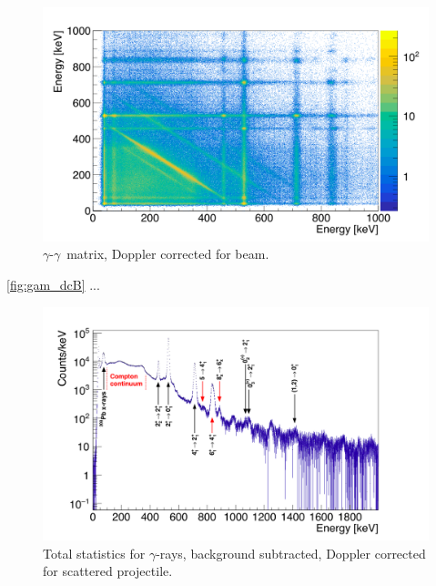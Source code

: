 \documentclass[twoside,english]{uiofysmaster/uiofysmaster}
\newcommand{\ga}{$\gamma$}
\let\orgautoref\autoref
\renewcommand{\autoref}
        {%
		 \def\subsectionautorefname{Section}%
		 \def\subsubsectionautorefname{Section}%
          \orgautoref}
\begin{document}
\begin{figure}[ht]
	\centering
	\includegraphics[width=\textwidth]{../Plots/plotting/gg_dcB.png}
	\caption{\ga-\ga\ matrix, Doppler corrected for beam.}
	\label{fig:gg_dcB}
\end{figure}


\autoref{fig:gam_dcB} ...

\begin{figure}[ht]
	\centering
	\includegraphics[width=\textwidth]{../Plots/plotting/gam_dcB.png}
	\caption{Total statistics for \ga-rays, 
      background subtracted, Doppler corrected for scattered projectile.}
	\label{fig:gam_dcB}
\end{figure}



\end{document}
